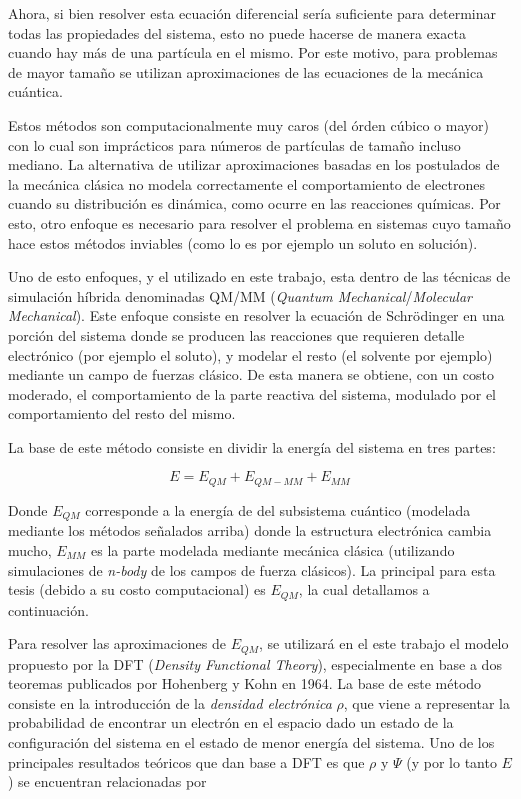Ahora, si bien resolver esta ecuaci\'on diferencial ser\'ia suficiente para determinar todas las propiedades del sistema, esto no puede hacerse de 
manera exacta cuando hay m\'as de una part\'icula en el mismo. Por este motivo, para problemas de mayor tama\~no se utilizan aproximaciones de las
ecuaciones de la mec\'anica cu\'antica.

Estos m\'etodos son computacionalmente muy caros (del \'orden c\'ubico o mayor) con lo cual son impr\'acticos para n\'umeros de part\'iculas de 
tama\~no incluso mediano. La alternativa de utilizar aproximaciones basadas en los postulados de la mec\'anica cl\'asica no modela correctamente el
comportamiento de electrones cuando su distribuci\'on es din\'amica, como ocurre en las reacciones qu\'imicas. Por esto, otro enfoque es necesario 
para resolver el problema en sistemas cuyo tama\~no hace estos m\'etodos inviables (como lo es por ejemplo un soluto en soluci\'on).

Uno de esto enfoques, y el utilizado en este trabajo, esta dentro de las t\'ecnicas de simulaci\'on h\'ibrida denominadas QM/MM 
(\textit{Quantum Mechanical}/\textit{Molecular Mechanical}). Este enfoque consiste en resolver la ecuaci\'on de
Schr\"odinger en una porci\'on del sistema donde se producen las reacciones que requieren detalle electr\'onico (por ejemplo el soluto), 
y modelar el resto (el solvente por ejemplo) mediante un campo de fuerzas cl\'asico. De esta manera se obtiene, con un costo moderado, 
el comportamiento de la parte reactiva del sistema, modulado por el comportamiento del resto del mismo.

La base de este m\'etodo consiste en dividir la energ\'ia del sistema en tres partes:

\begin{equation}
    \label{qmmm-eq}
    E = E_{QM} + E_{QM-MM} + E_{MM} 
\end{equation}

Donde $E_{QM}$ corresponde a la energ\'ia de del subsistema cu\'antico (modelada mediante los m\'etodos se\~nalados arriba) donde la estructura
electr\'onica cambia mucho, $E_{MM}$ es la parte modelada mediante mec\'anica cl\'asica (utilizando simulaciones de \textit{n-body} de los campos de
fuerza cl\'asicos). La principal para esta tesis (debido a su costo computacional) es $E_{QM}$, la cual detallamos a continuaci\'on.

Para resolver las aproximaciones de $E_{QM}$, se utilizar\'a en el este trabajo el modelo propuesto por la
DFT (\textit{Density Functional Theory}), especialmente en base a dos teoremas publicados por Hohenberg y Kohn en 1964. La base de este m\'etodo consiste en la introducci\'on de la
\textit{densidad electr\'onica} $\rho$, que viene a representar la probabilidad de encontrar un electr\'on en
el espacio dado un estado de la configuraci\'on del sistema en el estado de menor energ\'ia del sistema. Uno de los principales resultados te\'oricos que dan base a DFT es que 
$\rho$ y $\Psi$ (y por lo tanto $E$) se encuentran relacionadas por

